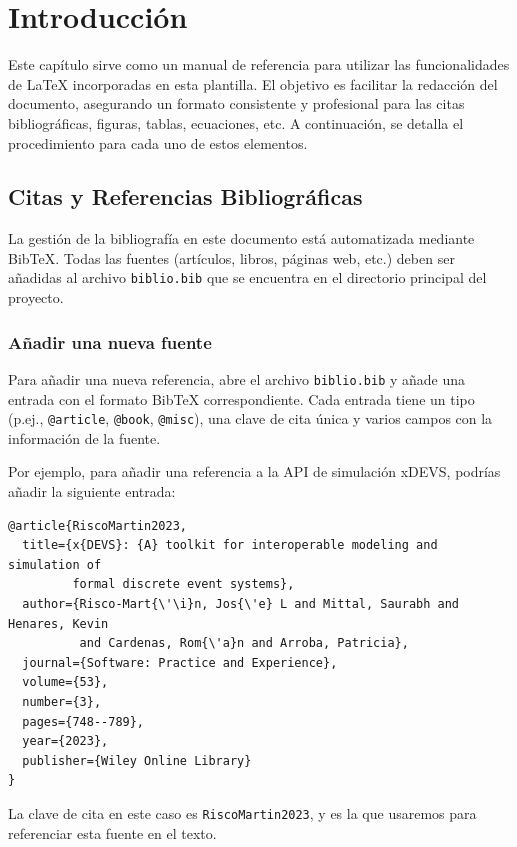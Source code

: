 \documentclass[11pt,a4paper]{book}
\begin{document}
\tableofcontents 
\listoftables
\listoffigures
\lstlistoflistings

\mainmatter

\chapter{Introducción}
Este capítulo sirve como un manual de referencia para utilizar las funcionalidades de \LaTeX{} incorporadas en esta plantilla. El objetivo es facilitar la redacción del documento, asegurando un formato consistente y profesional para las citas bibliográficas, figuras, tablas, ecuaciones, etc. A continuación, se detalla el procedimiento para cada uno de estos elementos.

\section{Citas y Referencias Bibliográficas}

La gestión de la bibliografía en este documento está automatizada mediante BibTeX. Todas las fuentes (artículos, libros, páginas web, etc.) deben ser añadidas al archivo \texttt{biblio.bib} que se encuentra en el directorio principal del proyecto.

\subsection{Añadir una nueva fuente}

Para añadir una nueva referencia, abre el archivo \texttt{biblio.bib} y añade una entrada con el formato BibTeX correspondiente. Cada entrada tiene un tipo (p.ej., \texttt{@article}, \texttt{@book}, \texttt{@misc}), una clave de cita única y varios campos con la información de la fuente.

Por ejemplo, para añadir una referencia a la API de simulación xDEVS, podrías añadir la siguiente entrada:
\begin{verbatim}
@article{RiscoMartin2023,
  title={x{DEVS}: {A} toolkit for interoperable modeling and simulation of 
         formal discrete event systems},
  author={Risco-Mart{\'\i}n, Jos{\'e} L and Mittal, Saurabh and Henares, Kevin 
          and Cardenas, Rom{\'a}n and Arroba, Patricia},
  journal={Software: Practice and Experience},
  volume={53},
  number={3},
  pages={748--789},
  year={2023},
  publisher={Wiley Online Library}
}
\end{verbatim}
La clave de cita en este caso es \texttt{RiscoMartin2023}, y es la que usaremos para referenciar esta fuente en el texto.
\end{document}
